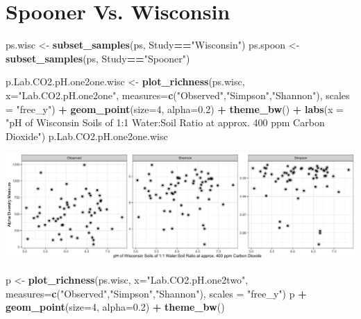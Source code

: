 \documentclass[]{article}
\newenvironment{Shaded}{\begin{snugshade}}{\end{snugshade}}
\newcommand{\DataTypeTok}[1]{\textcolor[rgb]{0.13,0.29,0.53}{#1}}
\newcommand{\DecValTok}[1]{\textcolor[rgb]{0.00,0.00,0.81}{#1}}
\newcommand{\FloatTok}[1]{\textcolor[rgb]{0.00,0.00,0.81}{#1}}
\newcommand{\KeywordTok}[1]{\textcolor[rgb]{0.13,0.29,0.53}{\textbf{#1}}}
\newcommand{\NormalTok}[1]{#1}
\newcommand{\OperatorTok}[1]{\textcolor[rgb]{0.81,0.36,0.00}{\textbf{#1}}}
\newcommand{\StringTok}[1]{\textcolor[rgb]{0.31,0.60,0.02}{#1}}
\begin{document}
\hypertarget{spooner-vs.-wisconsin}{%
\section{Spooner Vs. Wisconsin}\label{spooner-vs.-wisconsin}}

\begin{Shaded}
\begin{Highlighting}[]
\NormalTok{ps.wisc <-}\StringTok{ }\KeywordTok{subset_samples}\NormalTok{(ps, Study}\OperatorTok{==}\StringTok{"Wisconsin"}\NormalTok{)}
\NormalTok{ps.spoon <-}\StringTok{ }\KeywordTok{subset_samples}\NormalTok{(ps, Study}\OperatorTok{==}\StringTok{"Spooner"}\NormalTok{)}
\end{Highlighting}
\end{Shaded}

\begin{Shaded}
\begin{Highlighting}[]
\NormalTok{p.Lab.CO2.pH.one2one.wisc <-}\StringTok{ }\KeywordTok{plot_richness}\NormalTok{(ps.wisc, }\DataTypeTok{x=}\StringTok{"Lab.CO2.pH.one2one"}\NormalTok{, }\DataTypeTok{measures=}\KeywordTok{c}\NormalTok{(}\StringTok{"Observed"}\NormalTok{,}\StringTok{"Simpson"}\NormalTok{,}\StringTok{"Shannon"}\NormalTok{), }\DataTypeTok{scales =} \StringTok{"free_y"}\NormalTok{) }\OperatorTok{+}\StringTok{ }\KeywordTok{geom_point}\NormalTok{(}\DataTypeTok{size=}\DecValTok{4}\NormalTok{, }\DataTypeTok{alpha=}\FloatTok{0.2}\NormalTok{) }\OperatorTok{+}\StringTok{ }\KeywordTok{theme_bw}\NormalTok{() }\OperatorTok{+}\StringTok{ }\KeywordTok{labs}\NormalTok{(}\DataTypeTok{x =} \StringTok{"pH of Wisconsin Soils of 1:1 Water:Soil Ratio at approx. 400 ppm Carbon Dioxide"}\NormalTok{)}
\NormalTok{p.Lab.CO2.pH.one2one.wisc}
\end{Highlighting}
\end{Shaded}

\includegraphics{output-rmd/richness-ph-Lab.CO2.pH.one2one.wisc-1.png}

\begin{Shaded}
\begin{Highlighting}[]
\NormalTok{p <-}\StringTok{ }\KeywordTok{plot_richness}\NormalTok{(ps.wisc, }\DataTypeTok{x=}\StringTok{"Lab.CO2.pH.one2two"}\NormalTok{, }\DataTypeTok{measures=}\KeywordTok{c}\NormalTok{(}\StringTok{"Observed"}\NormalTok{,}\StringTok{"Simpson"}\NormalTok{,}\StringTok{"Shannon"}\NormalTok{), }\DataTypeTok{scales =} \StringTok{"free_y"}\NormalTok{)}
\NormalTok{p }\OperatorTok{+}\StringTok{ }\KeywordTok{geom_point}\NormalTok{(}\DataTypeTok{size=}\DecValTok{4}\NormalTok{, }\DataTypeTok{alpha=}\FloatTok{0.2}\NormalTok{) }\OperatorTok{+}\StringTok{ }\KeywordTok{theme_bw}\NormalTok{()}
\end{Highlighting}
\end{Shaded}
\end{document}
